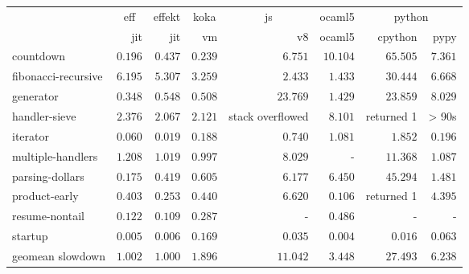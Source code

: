 \begin{tabular}{l r r r r r r r}
\toprule & \multicolumn{1}{c}{eff} & \multicolumn{1}{c}{effekt} & \multicolumn{1}{c}{koka} & \multicolumn{1}{c}{js} & \multicolumn{1}{c}{ocaml5} & \multicolumn{2}{c}{python} \\
\cmidrule(l){2-2}\cmidrule(l){3-3}\cmidrule(l){4-4}\cmidrule(l){5-5}\cmidrule(l){6-6}\cmidrule(l){7-8} 
 & jit & jit & vm & v8 & ocaml5 & cpython & pypy \\
\midrule
countdown & $\mathbf{0.196}$ & $0.437$ & $0.239$ & $6.751$ & $10.104$ & $65.505$ & $7.361$ \\
fibonacci-recursive & $6.195$ & $5.307$ & $3.259$ & $2.433$ & $\mathbf{1.433}$ & $30.444$ & $6.668$ \\
generator & $\mathbf{0.348}$ & $0.548$ & $0.508$ & $23.769$ & $1.429$ & $23.859$ & $8.029$ \\
handler-sieve & $2.376$ & $\mathbf{2.067}$ & $2.121$ & stack overflowed & $8.101$ & returned 1 & > 90s \\
iterator & $0.060$ & $\mathbf{0.019}$ & $0.188$ & $0.740$ & $1.081$ & $1.852$ & $0.196$ \\
multiple-handlers & $1.208$ & $1.019$ & $\mathbf{0.997}$ & $8.029$ & - & $11.368$ & $1.087$ \\
parsing-dollars & $\mathbf{0.175}$ & $0.419$ & $0.605$ & $6.177$ & $6.450$ & $45.294$ & $1.481$ \\
product-early & $0.403$ & $0.253$ & $0.440$ & $6.620$ & $\mathbf{0.106}$ & returned 1 & $4.395$ \\
resume-nontail & $0.122$ & $\mathbf{0.109}$ & $0.287$ & - & $0.486$ & - & - \\
startup & $0.005$ & $0.006$ & $0.169$ & $0.035$ & $\mathbf{0.004}$ & $0.016$ & $0.063$ \\
\midrule
 geomean slowdown & $1.002$ & $1.000$ & $1.896$ & $11.042$ & $3.448$ & $27.493$ & $6.238$ \\
\bottomrule
\end{tabular}